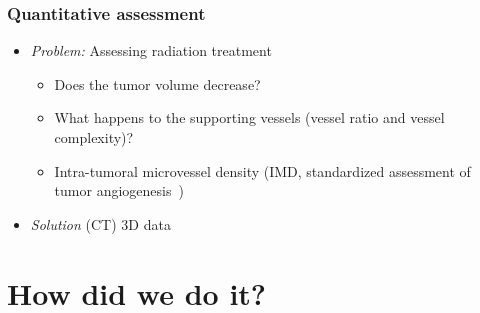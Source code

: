 \documentclass[draft]{beamer}
\newcommand{\uct}{\si{\micro}CT\xspace} %
\begin{document}
\begin{frame}
	\frametitle{Quantitative assessment}
	\begin{itemize}
		\item \emph{Problem:} Assessing radiation treatment
		\begin{itemize}
			\item Does the tumor volume decrease?
			\item What happens to the supporting vessels (vessel ratio and vessel complexity)?
			\item Intra-tumoral microvessel density (IMD, standardized assessment of tumor angiogenesis~\cite{Hasan2002})
		\end{itemize}
		\pause
		\item \emph{Solution} (\uct) 3D data
	\end{itemize}
\end{frame}

\section{How did we do it?}
\end{document}
